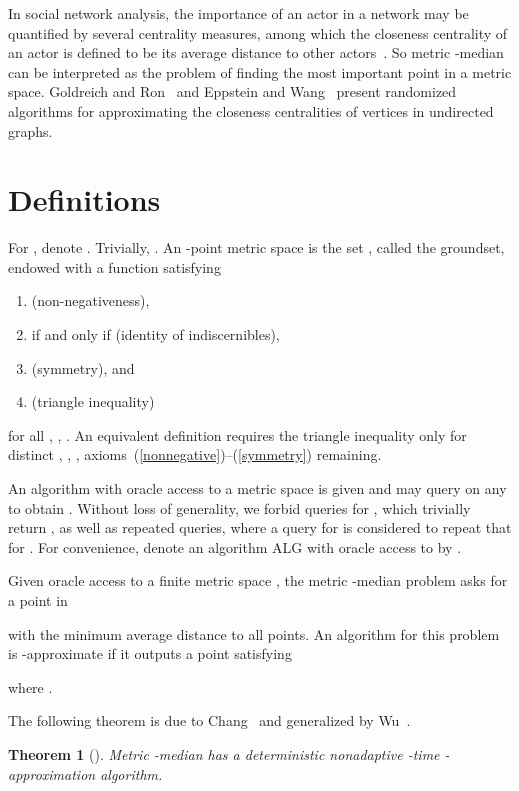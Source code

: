 \documentclass[letterpaper,12pt]{article}
\newtheorem{theorem}{Theorem}
\begin{document}
In social network analysis,
the importance of an actor in a network
may
be
quantified by
several
centrality measures, among which the closeness centrality of an actor is
defined to be
its average distance to other actors~\cite{WF94}.
So
{\sc metric -median}
can
be interpreted as the problem of finding the
most important point in a metric space.
Goldreich and Ron~\cite{GR08} and Eppstein and Wang~\cite{EW04} present
randomized algorithms for approximating the closeness centralities of
vertices in undirected graphs.



\section{Definitions}\label{definitionssection}

For ,
denote
.
Trivially, .
An -point metric space  is the set , called the groundset,
endowed with a function
 satisfying
\begin{enumerate}[(1)]
\item\label{nonnegative}
 (non-negativeness),
\item
 if and only if  (identity of indiscernibles),
\item\label{symmetry}
 (symmetry), and
\item
 (triangle inequality)
\end{enumerate}
for all , , .
An
equivalent definition
requires the triangle inequality only for distinct
, , , axioms~(\ref{nonnegative})--(\ref{symmetry}) remaining.




An algorithm with oracle access to a metric space 
is given  and may query
 on
any
 to obtain .
Without loss of generality,
we
forbid
queries for , which trivially return ,
as well as repeated queries, where
a query
for 
is considered to repeat that for
.
For convenience,
denote
an algorithm ALG with oracle access to 
by .

Given oracle access to a finite metric space , the
{\sc metric -median} problem asks for a point
in

with the minimum average distance to
all
points.
An algorithm for
this problem is
-approximate if
it outputs
a point 
satisfying

where
.

The following theorem is due to Chang~\cite{Cha13} and generalized by
Wu~\cite{Wu14}.

\begin{theorem}[{\cite{Cha13, Wu14}}]\label{nonadaptiveupperbound}
{\sc Metric -median} has a deterministic nonadaptive -time
-approximation algorithm.
\end{theorem}
\end{document}
